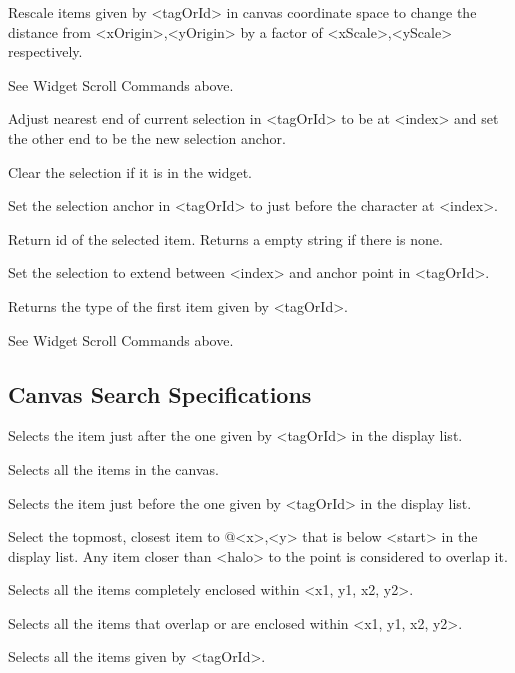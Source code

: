 \begin{enum}{1cm}
Rescale items given by <tagOrId> in canvas coordinate space to change  the
distance from <xOrigin>,<yOrigin> by a factor of <xScale>,<yScale> respectively.

See Widget Scroll Commands above.

Adjust nearest end of current selection in <tagOrId> to be at <index> and
set the other end to be the new selection anchor.

Clear the selection if it is in the widget.

Set the selection anchor in <tagOrId> to just before the character at <index>.

Return id of the selected item. Returns a empty string if there is none.

Set the selection to extend between <index> and anchor point in <tagOrId>.

Returns the type of the first item given by <tagOrId>.

See Widget Scroll Commands above.

\end{enum}


\subsection*{Canvas Search Specifications}
\begin{enum}{1cm}

Selects  the item just after the one given by <tagOrId> in the  display  list.

Selects all the items in the canvas.

Selects  the item just before the one given by <tagOrId> in the  display  list.

Select the topmost, closest item to @<x>,<y> that is below <start> in
the display list. Any item closer than <halo> to the point is
considered to overlap it.

Selects all the items completely enclosed within <x1, y1, x2, y2>.

Selects  all  the  items that overlap or are enclosed within <x1, y1, x2, y2>.

Selects all the items given by <tagOrId>.

\end{enum}
\vskip5pt

